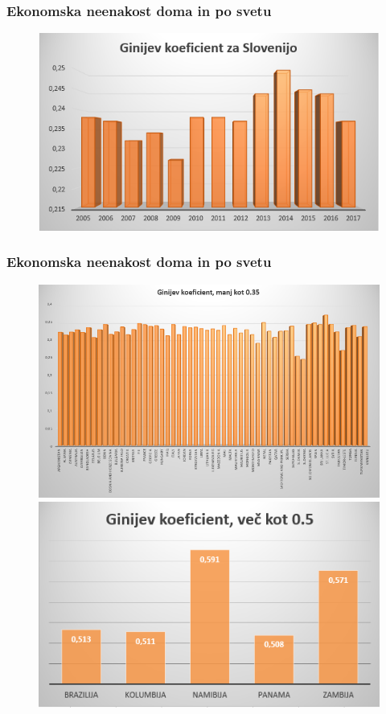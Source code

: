 \documentclass[10pt]{beamer}
\begin{document}
\begin{frame}
\frametitle{Ekonomska neenakost doma in po svetu}
\begin{figure}
\includegraphics[width= \linewidth]{./slike/gini-slo.PNG}
\end{figure}
\end{frame}

\begin{frame}
\frametitle{Ekonomska neenakost doma in po svetu}
\begin{figure}
\includegraphics[height=.3 \textwidth, width = .7\linewidth]{./slike/gini-manj-07.PNG}
\hspace{0.3\textwidth}
\hfill
\includegraphics[height=.3 \textwidth, width = .6\linewidth]{./slike/gini-vec-09.PNG}
\end{figure}
\end{frame}
\end{document}
